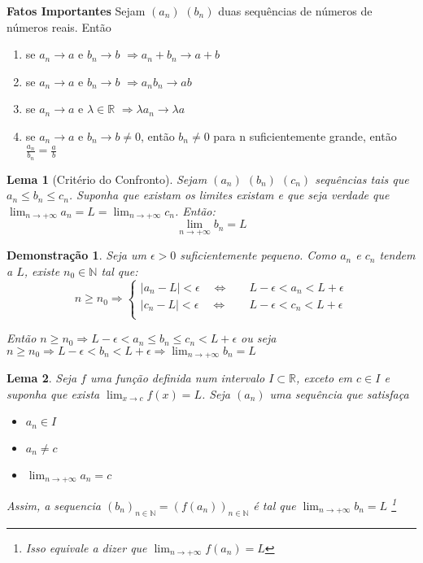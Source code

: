 \documentclass[12pt,openany, letterpaper]{book}
\newtheorem{lemma}{Lema}[section]
\newtheorem{demonstration}{Demonstração}
\begin{document}
\textbf{Fatos Importantes}
\hspace{5mm} Sejam $(a_n)$ $(b_n)$ duas sequências de números de números reais. Então \begin{enumerate}
\item se $a_n \rightarrow a $ e $b_n \rightarrow b$ $\Rightarrow a_n + b_n \rightarrow a + b$
\item se $a_n \rightarrow a $ e $b_n \rightarrow b$ $\Rightarrow a_nb_n \rightarrow ab$
\item se $a_n \rightarrow a $ e $\lambda \in \mathds{R}$ $\Rightarrow \lambda a_n \rightarrow \lambda a$
\item se $a_n \rightarrow a $ e $b_n \rightarrow b \neq 0$, então $b_n \neq 0$ para n suficientemente grande, então $\displaystyle{\frac{a_n}{b_n} = \frac{a}{b}}$
\end{enumerate}

\begin{lemma}[Critério do Confronto]
Sejam $(a_n)$ $(b_n)$ $(c_n)$ sequências tais que $a_n \leq b_n \leq c_n$. Suponha que existam os limites existam e que seja verdade que $\displaystyle{\lim_{n \rightarrow + \infty} a_n = L = \lim_{n \rightarrow + \infty} c_n}$. Então: $$\lim_{n \rightarrow + \infty} b_n = L$$
\end{lemma}

\begin{demonstration}
Seja um $\epsilon > 0$ suficientemente pequeno. Como $a_n$ e  $c_n$ tendem a $L$, existe $n_0 \in \mathds{N}$ tal que:
\[ n \geq n_0 \Rightarrow
  \begin{cases}
    |a_n - L| < \epsilon \quad \Longleftrightarrow  & \quad L - \epsilon < a_n < L +\epsilon \\
    |c_n - L| < \epsilon \quad \Longleftrightarrow  & \quad L - \epsilon < c_n < L +\epsilon \\
  \end{cases}
\]

Então $n \geq n_0 \Rightarrow L - \epsilon < a_n \leq b_n \leq c_n < L + \epsilon$ ou seja $n \geq n_0 \Rightarrow L- \epsilon < b_n < L + \epsilon \Rightarrow \displaystyle{\lim_{n \rightarrow + \infty} b_n = L}$
\end{demonstration}

\begin{lemma}
Seja $f$ uma função definida num intervalo $I \subset \mathds{R}$, exceto em $c \in I$ e suponha que exista $\displaystyle{\lim_{x \rightarrow c} f(x) = L}$. Seja $(a_n)$ uma sequência que satisfaça \begin{itemize}
\item [a.] $a_n \in I$
\item [b.] $a_n \neq c $
\item [c.] $\displaystyle{\lim_{n \rightarrow + \infty} a_n = c} $
\end{itemize}
Assim, a sequencia $(b_n)_{n \in \mathds{N}} =(f(a_n))_{n \in \mathds{N}}$ é tal que $\displaystyle{\lim_{n \rightarrow + \infty} b_n = L}$ \footnote{Isso equivale a dizer que $\displaystyle{\lim_{n \rightarrow + \infty} f(a_n) = L} $}
\end{lemma}
\end{document}
